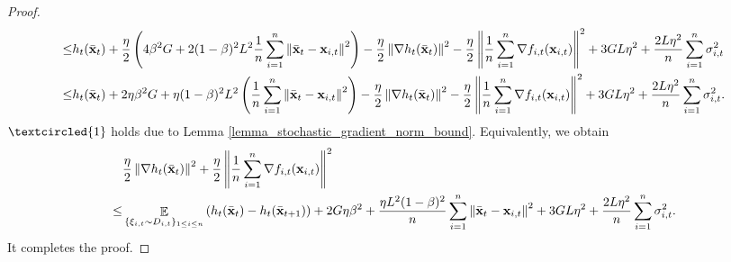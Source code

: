 \documentclass{article}
\begin{document}
\begin{proof}
\begin{align}
\le & h_t(\bar{{\bf x}}_t) + \frac{\eta}{2}\left( 4\beta^2 G + 2(1-\beta)^2 L^2\frac{1}{n}\sum_{i=1}^n \left\lVert\bar{{\bf x}}_t -{\bf x}_{i,t}\right\rVert^2   \right) - \frac{\eta}{2}\left\lVert\nabla h_t(\bar{{\bf x}}_t)\right\rVert^2 - \frac{\eta}{2}\left\lVert\frac{1}{n}\sum_{i=1}^n \nabla f_{i,t}({\bf x}_{i,t})\right\rVert^2  + 3GL\eta^2  + \frac{2L\eta^2}{n}\sum_{i=1}^n \sigma_{i,t}^2  \\ \nonumber
\le & h_t(\bar{{\bf x}}_t) + 2\eta\beta^2 G + \eta(1-\beta)^2 L^2\left( \frac{1}{n}\sum_{i=1}^n \left\lVert\bar{{\bf x}}_t -{\bf x}_{i,t}\right\rVert^2 \right)  - \frac{\eta}{2}\left\lVert\nabla h_t(\bar{{\bf x}}_t)\right\rVert^2 - \frac{\eta}{2}\left\lVert\frac{1}{n}\sum_{i=1}^n \nabla f_{i,t}({\bf x}_{i,t})\right\rVert^2  +  3GL\eta^2  + \frac{2L\eta^2}{n}\sum_{i=1}^n \sigma_{i,t}^2.
\end{align} $\textcircled{1}$ holds due to Lemma \ref{lemma_stochastic_gradient_norm_bound}. Equivalently, we obtain
\begin{align}
\nonumber
& \frac{\eta}{2}\left\lVert\nabla h_t(\bar{{\bf x}}_t)\right\rVert^2 + \frac{\eta}{2}\left\lVert\frac{1}{n}\sum_{i=1}^n \nabla f_{i,t}({\bf x}_{i,t})\right\rVert^2 \\ \nonumber 
\le & \mathop{\mathbb{E}}_{ \{\xi_{i,t} \sim D_{i,t}\}_{1\le i \le n} } \left( h_t(\bar{{\bf x}}_t) - h_t(\bar{{\bf x}}_{t+1}) \right) + 2G\eta\beta^2 +  \frac{\eta L^2(1-\beta)^2}{n}\sum_{i=1}^n\left\lVert\bar{{\bf x}}_t - {\bf x}_{i,t} \right\rVert^2 + 3GL\eta^2  + \frac{2L\eta^2}{n}\sum_{i=1}^n \sigma_{i,t}^2.
\end{align} It completes the proof.



\end{proof}
\end{document}
